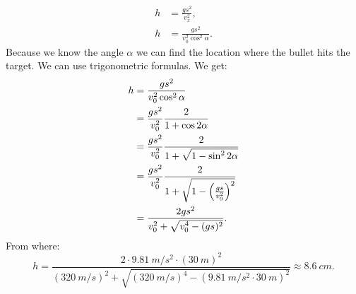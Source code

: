 {\begin{align*}
h & = \frac{gs^2}{v_{x}^2},\\
h & = \frac{gs^2}{v_{0}^2\cos^2\alpha}.
\end{align*} 
Because we know the angle $\alpha$ we can find the location where the bullet hits the target. We can use trigonometric formulas. We get:
\begin{align*}
h & = {gs^2 \over v_{0}^2\cos^2\alpha}\\
& = {gs^2 \over v_{0}^2}{2 \over 1+\cos2\alpha}\\
& = {gs^2 \over v_{0}^2}{2 \over 1+\sqrt{1-\sin^2 2\alpha}}\\
& = {gs^2 \over v_{0}^2}{2 \over 1+\sqrt{1-\Big({gs \over v_0^2}\Big)^2}}\\
& = {2gs^2 \over v_0^2+\sqrt{v_0^4-(gs)^2}}.
\end{align*}
From where:
$$
h  = \frac{2\cdot \SI{9,81}{m/s^2} \cdot (\SI{30}{m})^2}{(\SI{320}{m/s})^2+\sqrt{(\SI{320}{m/s})^4-(\SI{9,81}{m/s^2} \cdot \SI{30}{m})^2}} \approx \SI{8,6}{cm}.
$$
\fi
}